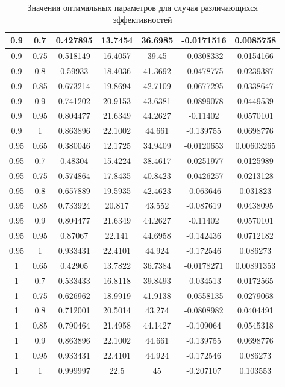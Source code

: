 \documentclass[%
master,         %
subf,           %
href,           %
,times         %
]{disser}
\numberwithin{equation}{section}
\numberwithin{figure}{section}
\begin{document}
\begin{longtable}{|c|c|c|c|c|c|c|}
0.9 & 0.7 & 0.427895 & 13.7454 & 36.6985 & -0.0171516 & 0.0085758\\\hline
0.9 & 0.75 & 0.518149 & 16.4057 & 39.45 & -0.0308332 & 0.0154166\\\hline
0.9 & 0.8 & 0.59933 & 18.4036 & 41.3692 & -0.0478775 & 0.0239387\\\hline
0.9 & 0.85 & 0.673214 & 19.8694 & 42.7109 & -0.0677295 & 0.0338647\\\hline
0.9 & 0.9 & 0.741202 & 20.9153 & 43.6381 & -0.0899078 & 0.0449539\\\hline
0.9 & 0.95 & 0.804477 & 21.6349 & 44.2627 & -0.11402 & 0.0570101\\\hline
0.9 & 1 & 0.863896 & 22.1002 & 44.661 & -0.139755 & 0.0698776\\\hline
0.95 & 0.65 & 0.380046 & 12.1725 & 34.9409 & -0.0120653 & 0.00603265\\\hline
0.95 & 0.7 & 0.48304 & 15.4224 & 38.4617 & -0.0251977 & 0.0125989\\\hline
0.95 & 0.75 & 0.574864 & 17.8435 & 40.8423 & -0.0426257 & 0.0213128\\\hline
0.95 & 0.8 & 0.657889 & 19.5935 & 42.4623 & -0.063646 & 0.031823\\\hline
0.95 & 0.85 & 0.733924 & 20.817 & 43.552 & -0.087619 & 0.0438095\\\hline
0.95 & 0.9 & 0.804477 & 21.6349 & 44.2627 & -0.11402 & 0.0570101\\\hline
0.95 & 0.95 & 0.87067 & 22.141 & 44.6958 & -0.142436 & 0.0712182\\\hline
0.95 & 1 & 0.933431 & 22.4101 & 44.924 & -0.172546 & 0.086273\\\hline
1 & 0.65 & 0.42905 & 13.7822 & 36.7384 & -0.0178271 & 0.00891353\\\hline
1 & 0.7 & 0.533433 & 16.8118 & 39.8493 & -0.034513 & 0.0172565\\\hline
1 & 0.75 & 0.626962 & 18.9919 & 41.9138 & -0.0558135 & 0.0279068\\\hline
1 & 0.8 & 0.712001 & 20.5014 & 43.274 & -0.0808982 & 0.0404491\\\hline
1 & 0.85 & 0.790464 & 21.4958 & 44.1427 & -0.109064 & 0.0545318\\\hline
1 & 0.9 & 0.863896 & 22.1002 & 44.661 & -0.139755 & 0.0698776\\\hline
1 & 0.95 & 0.933431 & 22.4101 & 44.924 & -0.172546 & 0.086273\\\hline
1 & 1 & 0.999997 & 22.5 & 45 & -0.207107 & 0.103553\\\hline
\caption{Значения оптимальных параметров для случая различающихся эффективностей}
\label{tab:different_etas}
\end{longtable}
\end{document}
